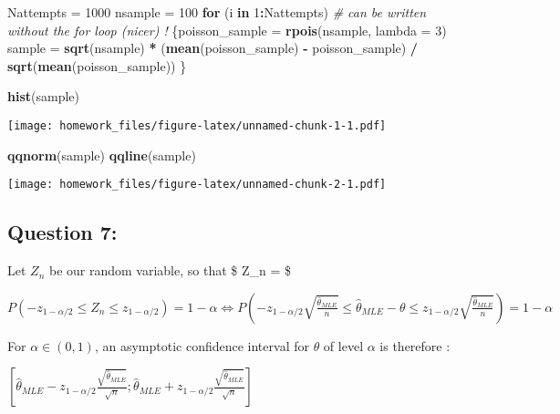 \documentclass[]{article}
\newenvironment{Shaded}{\begin{snugshade}}{\end{snugshade}}
\newcommand{\CommentTok}[1]{\textcolor[rgb]{0.56,0.35,0.01}{\textit{#1}}}
\newcommand{\ControlFlowTok}[1]{\textcolor[rgb]{0.13,0.29,0.53}{\textbf{#1}}}
\newcommand{\DataTypeTok}[1]{\textcolor[rgb]{0.13,0.29,0.53}{#1}}
\newcommand{\DecValTok}[1]{\textcolor[rgb]{0.00,0.00,0.81}{#1}}
\newcommand{\KeywordTok}[1]{\textcolor[rgb]{0.13,0.29,0.53}{\textbf{#1}}}
\newcommand{\NormalTok}[1]{#1}
\newcommand{\OperatorTok}[1]{\textcolor[rgb]{0.81,0.36,0.00}{\textbf{#1}}}
\newcommand{\StringTok}[1]{\textcolor[rgb]{0.31,0.60,0.02}{#1}}
\begin{document}
\begin{Shaded}
\begin{Highlighting}[]
\NormalTok{Nattempts =}\StringTok{ }\DecValTok{1000}
\NormalTok{nsample =}\StringTok{ }\DecValTok{100}
\ControlFlowTok{for}\NormalTok{ (i }\ControlFlowTok{in} \DecValTok{1}\OperatorTok{:}\NormalTok{Nattempts)  }\CommentTok{# can be written without the for loop (nicer) !}
\NormalTok{\{poisson_sample =}\StringTok{ }\KeywordTok{rpois}\NormalTok{(nsample, }\DataTypeTok{lambda =} \DecValTok{3}\NormalTok{)}
\NormalTok{  sample =}\StringTok{ }\KeywordTok{sqrt}\NormalTok{(nsample) }\OperatorTok{*}\StringTok{ }\NormalTok{(}\KeywordTok{mean}\NormalTok{(poisson_sample) }\OperatorTok{-}\StringTok{ }\NormalTok{poisson_sample) }\OperatorTok{/}\StringTok{ }\KeywordTok{sqrt}\NormalTok{(}\KeywordTok{mean}\NormalTok{(poisson_sample))}
\NormalTok{\}  }

\KeywordTok{hist}\NormalTok{(sample)}
\end{Highlighting}
\end{Shaded}

\texttt{[image: homework\_files/figure-latex/unnamed-chunk-1-1.pdf]}

\begin{Shaded}
\begin{Highlighting}[]
\KeywordTok{qqnorm}\NormalTok{(sample)}
\KeywordTok{qqline}\NormalTok{(sample)}
\end{Highlighting}
\end{Shaded}

\texttt{[image: homework\_files/figure-latex/unnamed-chunk-2-1.pdf]}

\hypertarget{question-7}{%
\subsection{Question 7:}\label{question-7}}

Let \(Z_n\) be our random variable, so that \$ Z\_n =
\$

\(\begin{equation} P(-z_{1-\alpha/2} ≤ Z_n ≤ z_{1-\alpha/2}) = 1- \alpha \iff P(-z_{1-\alpha/2} \sqrt{\frac{\hat\theta_{MLE}}{n}}≤ \hat\theta_{MLE} - \theta ≤ z_{1-\alpha/2}\sqrt{\frac{\hat\theta_{MLE}}{n}})= 1- \alpha \end{equation}\)

For \(\alpha \in (0, 1)\), an asymptotic confidence interval for
\(\theta\) of level \(\alpha\) is therefore :

\([\hat\theta_{MLE}-z_{1-\alpha/2}\frac{\sqrt{\hat\theta_{MLE}}}{\sqrt{n}};\hat\theta_{MLE}+z_{1-\alpha/2}\frac{\sqrt{\hat\theta_{MLE}}}{\sqrt{n}} ]\)
\end{document}
